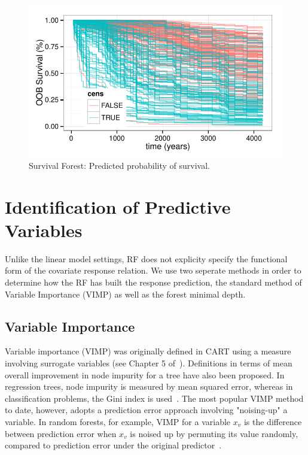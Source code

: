 \documentclass[nojss,letterpaper]{jss}\usepackage[]{graphicx}\usepackage[]{color}
\makeatletter
\def\maxwidth{ %
  \ifdim\Gin@nat@width>\linewidth
    \linewidth
  \else
    \Gin@nat@width
  \fi
}
\newenvironment{knitrout}{}{} %
\makeatother
\begin{document}
\begin{knitrout}\footnotesize
{}\color{fgcolor}\begin{figure}[!htpb]

{\centering \includegraphics[width=\maxwidth]{figure/vig-surv-rf-plot-1} 

}

\caption[Survival Forest]{Survival Forest: Predicted probability of survival.\label{fig:surv-rf-plot}}
\end{figure}


\end{knitrout}


\section{Identification of Predictive Variables}\label{S:variableIdentification}
Unlike the linear model settings, RF does not explicity specify the functional form of the covariate response relation. We use two seperate methods in order to determine how the RF has built the response prediction, the standard method of Variable Importance (VIMP) as well as the forest minimal depth.


\subsection{Variable Importance}\label{S:vimp}
Variable importance (VIMP) was originally defined in CART using a measure involving surrogate variables (see Chapter 5 of~\cite{cart:1984}). Definitions in terms of mean overall improvement in node impurity for a tree have also been proposed. In regression trees, node impurity is measured by mean squared error, whereas in classification problems, the Gini index is used~\citep{FriedmanGreedyfunction:2000}. The most popular VIMP method to date, however, adopts a prediction error approach involving "noising-up" a variable. In random forests, for example, VIMP for a variable $x_v$ is the difference between prediction error when $x_v$ is noised up by permuting its value randomly, compared to prediction error under the original predictor~\citep{Breiman:2001,liaw:2002,Ishwaran:2007,Ishwaran:2008}.
\end{document}
